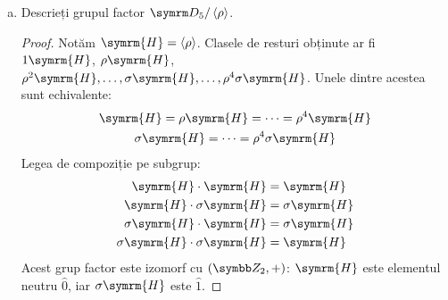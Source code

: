 \begin{enumerate}[(a)]
\begin{proof}
    Dacă nu ținem minte această observație, trebuie să calculăm toate clasele de resturi la stânga \(1 H, \rho H, \dots, \sigma H\) și toate clasele de resturi la dreapta \(H 1, H \rho, \dots, H \sigma\), și să arătăm că au același număr și corespund unu-la-unu.
    \end{proof}


    \item Descrieți grupul factor \(\dihedralgroup_5 \slash \generatedby{\rho}\).
    \begin{proof}
    Notăm \(\symrm{H} = \generatedby{\rho}\). Clasele de resturi obținute ar fi \(1 \symrm{H}\), \(\rho \symrm{H}\), \(\rho^2 \symrm{H}, \dots, \sigma \symrm{H}, \dots, \rho^4 \sigma \symrm{H}\). Unele dintre acestea sunt echivalente:
    \begin{gather*}
        \symrm{H} = \rho \symrm{H} = \dots = \rho^4 \symrm{H} \\
        \sigma \symrm{H} = \dots = \rho^4 \sigma \symrm{H}
    \end{gather*}
    Legea de compoziție pe subgrup:
    \begin{align*}
        \symrm{H} \cdot \symrm{H} &= \symrm{H} \\
        \symrm{H} \cdot \sigma \symrm{H} &= \sigma \symrm{H} \\
        \sigma \symrm{H} \cdot \symrm{H} &= \sigma \symrm{H} \\
        \sigma \symrm{H} \cdot \sigma \symrm{H} &= \symrm{H}
    \end{align*}
    Acest grup factor este izomorf cu \((\integersmod{2}, +)\): \(\symrm{H}\) este elementul neutru \(\widehat{0}\), iar \(\sigma \symrm{H}\) este \(\widehat{1}\).
    \end{proof}
\end{enumerate}

